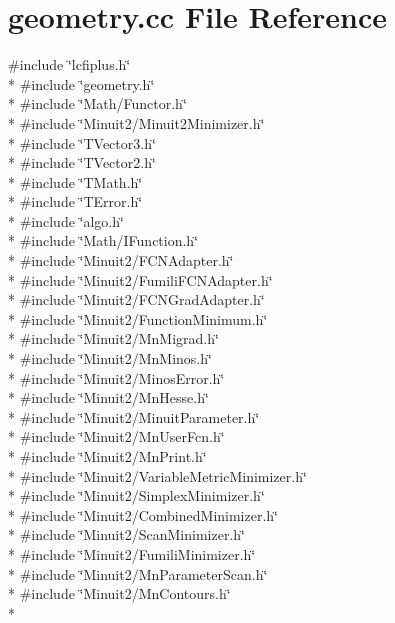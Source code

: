 \section{geometry.\-cc File Reference}
\label{geometry_8cc}
{\ttfamily \#include \char`\"{}lcfiplus.\-h\char`\"{}}\\*
{\ttfamily \#include \char`\"{}geometry.\-h\char`\"{}}\\*
{\ttfamily \#include \char`\"{}Math/\-Functor.\-h\char`\"{}}\\*
{\ttfamily \#include \char`\"{}Minuit2/\-Minuit2\-Minimizer.\-h\char`\"{}}\\*
{\ttfamily \#include \char`\"{}T\-Vector3.\-h\char`\"{}}\\*
{\ttfamily \#include \char`\"{}T\-Vector2.\-h\char`\"{}}\\*
{\ttfamily \#include \char`\"{}T\-Math.\-h\char`\"{}}\\*
{\ttfamily \#include \char`\"{}T\-Error.\-h\char`\"{}}\\*
{\ttfamily \#include \char`\"{}algo.\-h\char`\"{}}\\*
{\ttfamily \#include \char`\"{}Math/\-I\-Function.\-h\char`\"{}}\\*
{\ttfamily \#include \char`\"{}Minuit2/\-F\-C\-N\-Adapter.\-h\char`\"{}}\\*
{\ttfamily \#include \char`\"{}Minuit2/\-Fumili\-F\-C\-N\-Adapter.\-h\char`\"{}}\\*
{\ttfamily \#include \char`\"{}Minuit2/\-F\-C\-N\-Grad\-Adapter.\-h\char`\"{}}\\*
{\ttfamily \#include \char`\"{}Minuit2/\-Function\-Minimum.\-h\char`\"{}}\\*
{\ttfamily \#include \char`\"{}Minuit2/\-Mn\-Migrad.\-h\char`\"{}}\\*
{\ttfamily \#include \char`\"{}Minuit2/\-Mn\-Minos.\-h\char`\"{}}\\*
{\ttfamily \#include \char`\"{}Minuit2/\-Minos\-Error.\-h\char`\"{}}\\*
{\ttfamily \#include \char`\"{}Minuit2/\-Mn\-Hesse.\-h\char`\"{}}\\*
{\ttfamily \#include \char`\"{}Minuit2/\-Minuit\-Parameter.\-h\char`\"{}}\\*
{\ttfamily \#include \char`\"{}Minuit2/\-Mn\-User\-Fcn.\-h\char`\"{}}\\*
{\ttfamily \#include \char`\"{}Minuit2/\-Mn\-Print.\-h\char`\"{}}\\*
{\ttfamily \#include \char`\"{}Minuit2/\-Variable\-Metric\-Minimizer.\-h\char`\"{}}\\*
{\ttfamily \#include \char`\"{}Minuit2/\-Simplex\-Minimizer.\-h\char`\"{}}\\*
{\ttfamily \#include \char`\"{}Minuit2/\-Combined\-Minimizer.\-h\char`\"{}}\\*
{\ttfamily \#include \char`\"{}Minuit2/\-Scan\-Minimizer.\-h\char`\"{}}\\*
{\ttfamily \#include \char`\"{}Minuit2/\-Fumili\-Minimizer.\-h\char`\"{}}\\*
{\ttfamily \#include \char`\"{}Minuit2/\-Mn\-Parameter\-Scan.\-h\char`\"{}}\\*
{\ttfamily \#include \char`\"{}Minuit2/\-Mn\-Contours.\-h\char`\"{}}\\*
